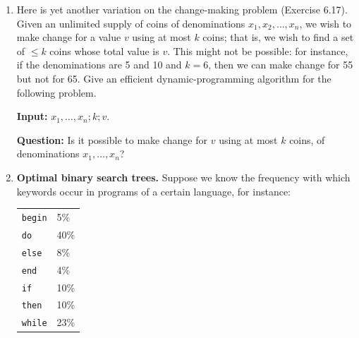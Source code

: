 \documentclass[12pt]{article}
\begin{document}
\begin{enumerate}[label=\textbf{6.\arabic*.}]
\begin{figure}[h]
\centering
\begin{minipage}{0.45\textwidth}
\centering
\textbf{First Binary Search Tree:}
\begin{verbatim}
       end
      /    \
    do      then
   /  \     /   \
begin else  if   while
\end{verbatim}
\end{minipage}
\hfill
\begin{minipage}{0.45\textwidth}
\centering
\textbf{Second Binary Search Tree:}
\begin{verbatim}
       do
      /  \
   begin  while
          /  
         if   
        /  \
     else   then
            \
             end
\end{verbatim}
\end{minipage}
\caption{Two binary search trees for the keywords of a programming language.}
\label{fig:bst}
\end{figure}

\textbf{Input:} Positive integers $x_1, x_2, \ldots, x_n$; another integer $v$.

\textbf{Output:} Can you make change for $v$, using each denomination $x_i$ at most once?

Show how to solve this problem in time $O(nv)$.

\item Here is yet another variation on the change-making problem (Exercise 6.17).
Given an unlimited supply of coins of denominations $x_1, x_2, \ldots, x_n$, we wish to make change for
a value $v$ using at most $k$ coins; that is, we wish to find a set of $\leq k$ coins whose total value is $v$.
This might not be possible: for instance, if the denominations are 5 and 10 and $k = 6$, then we
can make change for 55 but not for 65. Give an efficient dynamic-programming algorithm for the
following problem.

\textbf{Input:} $x_1, \ldots, x_n; k; v$.

\textbf{Question:} Is it possible to make change for $v$ using at most $k$ coins, of denominations
$x_1, \ldots, x_n$?

\item \textbf{Optimal binary search trees.} Suppose we know the frequency with which keywords occur in
programs of a certain language, for instance:
\begin{center}
\begin{tabular}{ll}
\texttt{begin} & 5\% \\
\texttt{do} & 40\% \\
\texttt{else} & 8\% \\
\texttt{end} & 4\% \\
\texttt{if} & 10\% \\
\texttt{then} & 10\% \\
\texttt{while} & 23\% \\
\end{tabular}
\end{center}


\end{enumerate}
\end{document}
